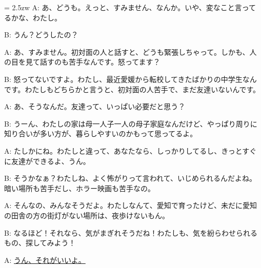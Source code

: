 \documentclass[11pt]{amsart}
\title{}
\author{}
\newenvironment{hangall}[1]{\hangindent = 2.5zw\everypar{\hangindent = 2.5zw}}{}
\begin{document}
\maketitle
\begin{hangall}{}%
A: あ、どうも。えっと、すみません、なんか。いや、変なこと言ってるかな、わたし。

B: うん？どうしたの？

A: あ、すみません。初対面の人と話すと、どうも緊張しちゃって。しかも、人の目を見て話すのも苦手なんです。怒ってます？

B: 怒ってないですよ。わたし、最近愛媛から転校してきたばかりの中学生なんです。わたしもどちらかと言うと、初対面の人苦手で、まだ友達いないんです。

A: あ、そうなんだ。友達って、いっぱい必要だと思う？

B: うーん、わたしの家は母一人子一人の母子家庭なんだけど、やっぱり周りに知り合いが多い方が、暮らしやすいのかもって思ってるよ。

A: たしかにね。わたしと違って、あなたなら、しっかりしてるし、きっとすぐに友達ができるよ、うん。

B: そうかなぁ？わたしね、よく怖がりって言われて、いじめられるんだよね。暗い場所も苦手だし、ホラー映画も苦手なの。

A: そんなの、みんなそうだよ。わたしなんて、愛知で育ったけど、未だに愛知の田舎の方の街灯がない場所は、夜歩けないもん。

B: なるほど！それなら、気がまぎれそうだね！わたしも、気を紛らわせられるもの、探してみよう！

A: \ul{うん、それがいいよ。}\end{hangall}
\end{document}
